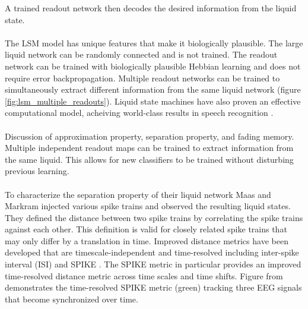 \documentclass[a4paper,11pt]{article}
\begin{document}
A trained readout network then decodes the desired information from the liquid state. 
\\ \\
The LSM model has unique features that make it biologically plausible. 
The large liquid network can be randomly connected and is not trained.
The readout network can be trained with biologically plausible Hebbian learning and does not require error backpropagation.
Multiple readout networks can be trained to simultaneously extract different information from the same liquid network (figure \ref{fig:lsm_multiple_readouts}).
Liquid state machines have also proven an effective computational model, acheiving world-class results in speech recognition \cite{zhang2015}.
\\ \\
Discussion of approximation property, separation property, and fading memory.
\\

Multiple independent readout maps can be trained to extract information from the same liquid.
This allows for new classifiers to be trained without disturbing previous learning.
\\ \\
To characterize the separation property of their liquid network Maas and Markram injected various spike trains and observed the resulting liquid states.
They defined the distance between two spike trains by correlating the spike trains against each other.
This definition is valid for closely related spike trains that may only differ by a translation in time.  
Improved distance metrics have been developed that are timescale-independent and time-resolved including inter-spike interval (ISI) and SPIKE \cite{kreuz2012}.
The SPIKE metric in particular provides an improved time-resolved distance metric across time scales and time shifts.
Figure from \cite{kreuz2012} demonstrates the time-resolved SPIKE metric (green) tracking three EEG signals that become synchronized over time.
\end{document}
